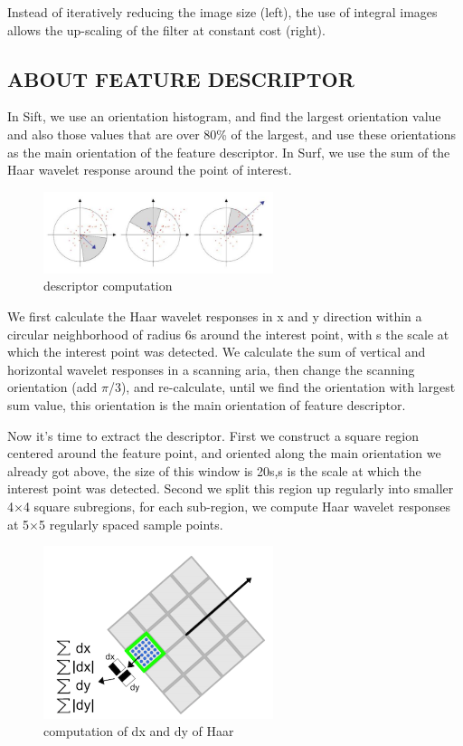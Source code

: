  Instead of iteratively reducing the image size (left), the use of integral images allows the up-scaling of the filter at constant cost (right).\\
 
 \subsection{ABOUT FEATURE DESCRIPTOR}
 In Sift, we use an orientation histogram, and find the largest orientation value and also those values that are over 80\% of the largest, and use these orientations as the main orientation of the feature descriptor. In Surf, we use the sum of the Haar wavelet response around the point of interest.

\begin{figure}[H]
\centering
\includegraphics[width=0.6\textwidth]{img/surf3.jpg}
\caption{descriptor computation }
\label{fig:surf2}
\end{figure}

We first calculate the Haar wavelet responses in x and y direction within a circular neighborhood of radius 6s around the interest point, with s the scale at which the interest point was detected. We calculate the sum of vertical and horizontal wavelet responses in a scanning aria, then change the scanning orientation (add $\pi$/3), and re-calculate, until we find the orientation with largest sum value, this orientation is the main orientation of feature descriptor.

Now it’s time to extract the descriptor. First we construct a square region centered around the feature point, and oriented along the main orientation we already got above, the size of this window is 20s,s is the scale at which the interest point was detected. Second we split this region up regularly into smaller 4$\times$4 square subregions, for each sub-region, we compute Haar wavelet responses at 5$\times$5 regularly spaced sample points.


\begin{figure}[H]
\centering
\includegraphics[width=0.6\textwidth]{img/surf5.png}
\caption{computation of dx and dy of Haar  }
\label{fig:surf5}
\end{figure}

